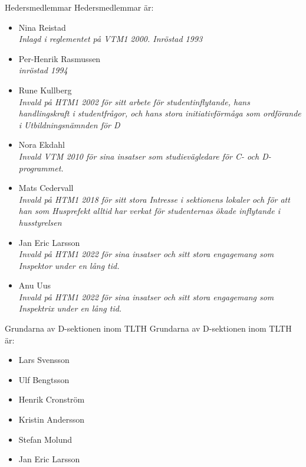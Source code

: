 \documentclass[pdfbookmarks,a4paper,11pt]{article}
\newlength{\itemcollength}
\newenvironment{reglemlista}{%
  \begin{list}{}{%
      \setlength{\labelwidth}{\itemcollength}%
      \setlength{\leftmargin}{\labelwidth + \labelsep}%
      \renewcommand{\makelabel}[1]{%
        \raisebox{0pt}[1ex][0pt]{%
          \makebox[\labelwidth][l]{%
            \parbox[t]{\itemcollength}{%
              \raggedright\hspace{0pt}##1}}}\hfill}%
      }}{%
  \end{list}}
\begin{document}
\begin{reglemlista}

	\item[Hedersmedlemmar]
	Hedersmedlemmar är:
	\begin{itemize}
		\item Nina Reistad\\
		      \emph{Inlagd i reglementet på VTM1 2000. Inröstad 1993}
		\item Per-Henrik Rasmussen \\ \emph{inröstad 1994}
		\item Rune Kullberg\\
		      \emph{Invald på HTM1 2002 för sitt arbete för studentinflytande, hans handlingskraft i studentfrågor, och hans stora initiativförmåga som ordförande i Utbildningsnämnden för D}
		\item Nora Ekdahl\\
		      \emph{Invald VTM 2010 för sina insatser som studievägledare för C- och D-programmet.}
		\item Mats Cedervall \\
		      \emph{Invald på HTM1 2018 för sitt stora Intresse i sektionens lokaler och för att han som Husprefekt alltid har verkat för studenternas ökade inflytande i husstyrelsen}
		\item Jan Eric Larsson \\
			  \emph{Invald på HTM1 2022 för sina insatser och sitt stora engagemang som Inspektor under en lång tid.}
		\item Anu Uus \\
			  \emph{Invald på HTM1 2022 för sina insatser och sitt stora engagemang som Inspektrix under en lång tid.}
	\end{itemize}

	\item[Grundarna av D-sektionen inom TLTH]
	Grundarna av D-sektionen inom TLTH är:

	\begin{itemize}
		\item Lars Svensson
		\item Ulf Bengtsson
		\item Henrik Cronström
		\item Kristin Andersson
		\item Stefan Molund
		\item Jan Eric Larsson
	\end{itemize}

\end{reglemlista}
\end{document}
